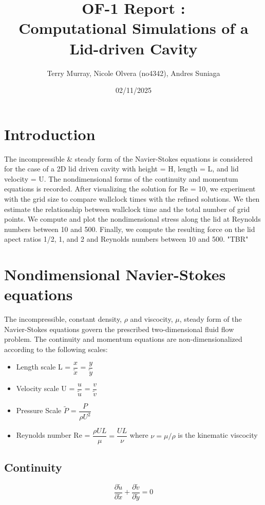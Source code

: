 \documentclass[11pt]{article}
\title{\bf OF-1 Report : \\[2mm] Computational Simulations of a Lid-driven Cavity}
\author{Terry Murray, Nicole Olvera (no4342), Andres Suniaga}
\date{02/11/2025}
\begin{document}
\maketitle

\noindent\makebox[\textwidth]{\rule{\textwidth}{0.2pt}}
\tableofcontents
\noindent\makebox[\textwidth]{\rule{\textwidth}{0.2pt}}
\pagebreak

\section{Introduction}
The incompressible \& steady form of the Navier-Stokes equations is considered for the case of a 2D lid driven cavity with height = H, length = L, and lid velocity = U. 
The nondimensional forms of the continuity and momentum equations is recorded. After visualizing the solution for Re = 10, we experiment with the grid size to compare wallclock times with the refined solutions. 
We then estimate the relationship between wallclock time and the total number of grid points. We compute and plot the nondimensional stress along the lid at Reynolds numbers between 10 and 500. 
Finally, we compute the resulting force on the lid apect ratios 1/2, 1, and 2 and Reynolds numbers between 10 and 500. "TBR"


\section{Nondimensional Navier-Stokes equations}
The incompressible, constant density, $\rho$ and viscocity, $\mu$, steady form of the Navier-Stokes equations govern the prescribed two-dimensional fluid flow problem. The continuity and momentum equations are non-dimensionalized according to the following scales:
\begin{itemize}
    \item Length scale L = $\dfrac{x}{\tilde{x}}$ = $\dfrac{y}{\tilde{y}}$
    \item Velocity scale U = $\dfrac{u}{\tilde{u}}$ = $\dfrac{v}{\tilde{v}}$
    \item Pressure Scale $\tilde{P}$ = $\dfrac{P}{\rho U^2}$
    \item Reynolds number Re = $\dfrac{\rho UL}{\mu} = \dfrac{UL}{\nu}$ where $\nu = \mu/\rho$ is the kinematic viscocity
\end{itemize}

\subsection*{Continuity}
\begin{equation*}
    \frac{\partial \tilde{u}}{\partial \tilde{x}} + \frac{\partial \tilde{v}}{\partial \tilde{y}} = 0
\end{equation*}
\end{document}
